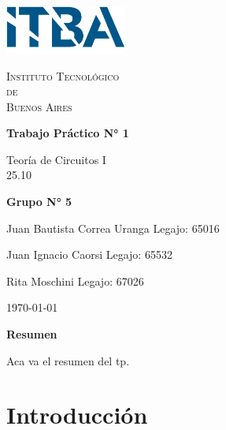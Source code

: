 \documentclass{article}
\newcommand{\Facultad}{Instituto Tecnológico \\de\\ Buenos Aires} %
\newcommand{\TPn}{Trabajo Práctico N° 1}
\begin{document}
    \begin{titlepage} %

        \begin{flushleft}
            \centering
            \includegraphics[width=0.3\textwidth]{Logo_ITBA.png}
        \end{flushleft}

        \centering
            
        {\scshape\LARGE \Facultad \par} %
        \vspace{1cm}                    %


        {\huge\bfseries \TPn \par}
        \vspace{1.5cm}
        {\Large Teoría de Circuitos I\\ 25.10 \par}
        \vfill                      %
        {\Large \bfseries Grupo N° 5 \par}
        \vspace{1cm}
        {\large Juan Bautista Correa Uranga \hfill Legajo: 65016 \par} %
        {\large Juan Ignacio Caorsi \hfill Legajo: 65532  \par}
        {\large Rita Moschini \hfill Legajo: 67026 \par} 
        \vfill
        {\large \today\par}
        \vfil

    \end{titlepage}


    {\centering \LARGE \bfseries Resumen \par}
        Aca va el resumen del tp. \par
    \newpage

    \tableofcontents %
    \newpage

    \section{Introducción}
\end{document}
